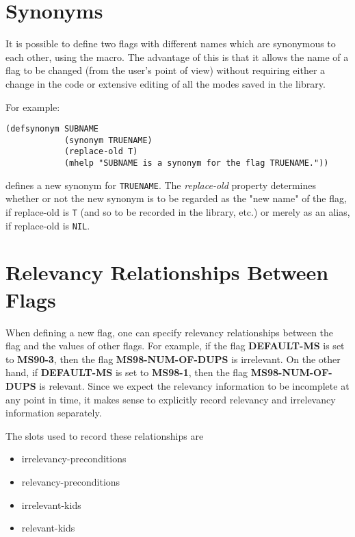 \section{Synonyms}

It is possible to define two flags with different names which are 
synonymous to each other, using the  macro.
The advantage of this is that it allows the name of a flag to be changed
(from the user's point of view) without requiring either a change in the
code or extensive editing of all the modes saved in the library.

For example:

\begin{verbatim}
(defsynonym SUBNAME
            (synonym TRUENAME)
            (replace-old T)
            (mhelp "SUBNAME is a synonym for the flag TRUENAME."))
\end{verbatim}

defines a new synonym for {\tt TRUENAME}. The {\it replace-old} property 
determines whether or not the new synonym is to be regarded as the
"new name" of the flag, if replace-old is {\tt T} 
(and so to be recorded in the library, etc.) 
or merely as an alias, if replace-old is {\tt NIL}.

\section{Relevancy Relationships Between Flags}

When defining a new flag, one can specify relevancy relationships
between the flag and the values of other flags.  For example,
if the flag {\bf DEFAULT-MS} is set to {\bf MS90-3}, then
the flag {\bf MS98-NUM-OF-DUPS} is irrelevant.  On the other
hand, if {\bf DEFAULT-MS} is set to {\bf MS98-1}, then the
flag {\bf MS98-NUM-OF-DUPS} is relevant.  Since we expect the
relevancy information to be incomplete at any point in time,
it makes sense to explicitly record relevancy and irrelevancy
information separately.

The slots used to record these relationships are
\begin{itemize}
\item irrelevancy-preconditions
\item relevancy-preconditions
\item irrelevant-kids
\item relevant-kids
\end{itemize}

